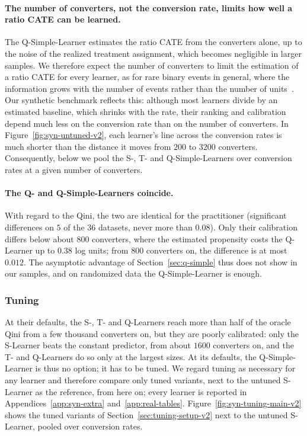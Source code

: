 \documentclass{article}
\begin{document}
\paragraph{The number of converters, not the conversion rate, limits how well
a ratio CATE can be learned.}
The Q-Simple-Learner estimates the ratio CATE from the converters alone, up
to the noise of the realized treatment assignment, which becomes negligible
in larger samples. We therefore expect the number of converters to limit the
estimation of a ratio CATE for every learner, as for rare binary events in
general, where the information grows with the number of events rather than
the number of units~\citep{king2001rare,owen2007infinitely}. Our synthetic
benchmark reflects this: although most learners divide by an estimated
baseline, which shrinks with the rate, their ranking and calibration depend
much less on the conversion rate than on the number of converters. In
Figure~\ref{fig:syn-untuned-v2}, each learner's line across the conversion
rates is much shorter than the distance it moves from $200$ to $3200$
converters. Consequently, below we pool the S-, T- and Q-Simple-Learners over
conversion rates at a given number of converters.

\paragraph{The Q- and Q-Simple-Learners coincide.}
With regard to the Qini, the two are identical for the practitioner
(significant differences on $5$ of the $36$ datasets, never more than
$0.08$). Only their calibration differs below about $800$
converters, where the estimated propensity costs the Q-Learner up to $0.38$
log units; from $800$ converters on, the difference is at most $0.012$.
The asymptotic advantage of
Section~\ref{sec:q-simple} thus does not show in our samples, and on
randomized data the Q-Simple-Learner is enough.

\subsubsection{Tuning}
\label{sec:syn-tuning-v2}
At their defaults, the S-, T- and Q-Learners reach more than half of the
oracle Qini from a few thousand converters on, but they are poorly
calibrated: only the S-Learner beats the constant predictor, from about
$1600$ converters on, and the T- and Q-Learners do so only at the largest
sizes. At its defaults, the Q-Simple-Learner is thus no option; it has to be
tuned. We regard tuning as necessary for any learner and therefore compare
only tuned variants, next to the untuned S-Learner as the reference, from
here on; every
learner is reported in Appendices~\ref{app:syn-extra}
and~\ref{app:real-tables}. Figure~\ref{fig:syn-tuning-main-v2} shows the tuned variants of
Section~\ref{sec:tuning-setup-v2} next to the untuned S-Learner, pooled over
conversion rates.
\end{document}
